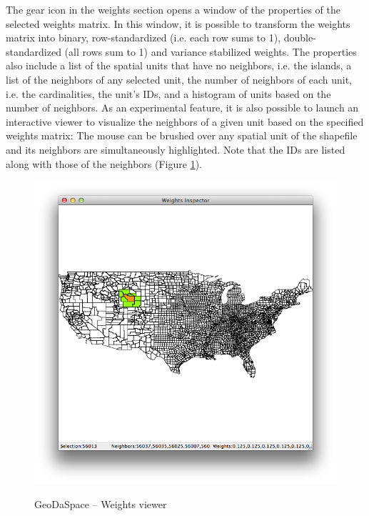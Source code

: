 \documentclass{article}
\begin{document}
The gear icon in the weights section opens a window of the properties of the selected weights matrix. In this window, it is possible to transform the weights matrix into binary, row-standardized (i.e. each row sums to 1), double-standardized (all rows sum to 1) and variance stabilized weights. The properties also include a list of the spatial units that have no neighbors, i.e. the islands, a list of the neighbors of any selected unit, the number of neighbors of each unit, i.e. the cardinalities, the unit's IDs, and a histogram of units based on the number of neighbors. As an experimental feature, it is also possible to launch an interactive viewer to visualize the neighbors of a given unit based on the specified weights matrix: The mouse can be brushed over any spatial unit of the shapefile and its neighbors are simultaneously highlighted. Note that the IDs are listed along with those of the neighbors (Figure \ref{f:viewer}).

\begin{figure}[htb]
\begin{center}
\includegraphics[width=\linewidth]{viewer.png}\\
\caption{GeoDaSpace -- Weights viewer}
\label{f:viewer}
\end{center}
\end{figure}
\FloatBarrier
\end{document}

